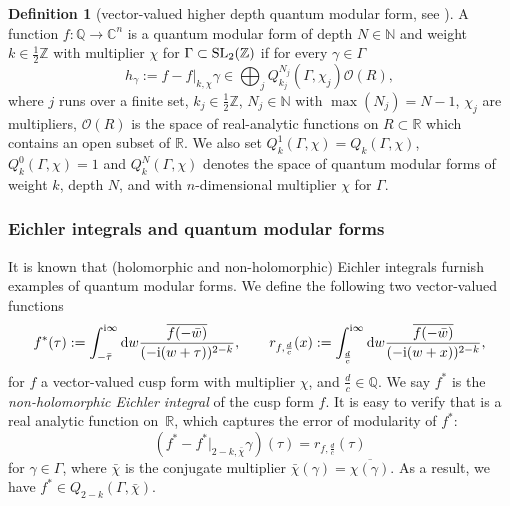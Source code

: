 \documentclass[10pt,a4paper]{amsart}
\def\BR{\mathbb{R}}
\def\BN{\mathbb{N}}
\def\BC{\mathbb{C}}
\def\BZ{\mathbb{Z}}
\theoremstyle{definition}
\newtheorem{defn}[thm]{Definition}
\numberwithin{equation}{section}
\begin{document}
\begin{defn}[vector-valued higher depth quantum modular form, see \cite{bringmann2019vectorvalued}]\label{dfn:higher_depth_qmf}
A function $f\colon{\mathbb Q}\to\BC^n$ is a quantum modular form of depth $N\in\BN$ and weight $k\in\frac{1}{2}\BZ$ with multiplier $\chi$ for $\Gamma\subset {\rm SL}_2(\BZ)$ if for every $\gamma\in\Gamma$
\[
	h_\gamma := f - f\lvert_{k,\chi}\gamma \in \bigoplus_j Q_{k_j}^{N_j} (\Gamma,\chi_j) \mathcal{O}(R),
\]
where $j$ runs over a finite set, $k_j\in\frac{1}{2}\BZ$, $N_j\in\BN$ with $\max (N_j)=N-1$, $\chi_j$ are multipliers, $\mathcal{O}(R)$ is the space of real-analytic functions on $R\subset\BR$ which contains an open subset of $\BR$. We also set $Q_k^1 (\Gamma,\chi)= Q_k (\Gamma,\chi)$, $Q_k^0 (\Gamma,\chi)=1$ and $Q_k^N (\Gamma,\chi)$ denotes the space of quantum modular forms of weight $k$, depth $N$, and with $n$-dimensional multiplier $\chi$ for $\Gamma$.
\end{defn}


\subsubsection*{Eichler integrals and quantum modular forms}
It is known that (holomorphic and non-holomorphic) Eichler integrals furnish examples of quantum modular forms. We define the following two vector-valued functions
\begin{equation}\label{dfn:Eich_period}
 f^\ast(\tau) := \int_{-\bar{\tau}}^{{\rm i}\infty} {\rm d}w
\frac{\overline{f(-\bar w)}}{(-{\rm i}(w+\tau))^{2-k}}, \qquad
r_{f,\frac{d}{c}} (x) := \int_{\frac{d}{c}}^{{\rm i}\infty} {\rm d}w
\frac{\overline{f(-\bar w)}}{(-{\rm i}(w+x))^{2-k}},
\end{equation}
for $f$ a vector-valued cusp form with multiplier $\chi$, and $\frac{d}{c}\in {\mathbb Q}$. We say $f^\ast$ is the {\it non-holomorphic Eichler integral} of the cusp form $f$. It is easy to verify that  is a real analytic function on~${\mathbb R}$, which captures the error of modularity of $f^\ast$:
\[
 ( f^\ast- f^\ast\lvert_{2-k,\bar\chi}\gamma)(\tau) = r_{f,\frac{d}{c}} (\tau)
\]
for $\gamma \in \Gamma$, where $\bar\chi$ is the conjugate multiplier $\bar\chi(\gamma)=\overline{\chi(\gamma)}$. As a result, we have $f^\ast\in Q_{2-k}(\Gamma, \bar \chi)$.
\end{document}
